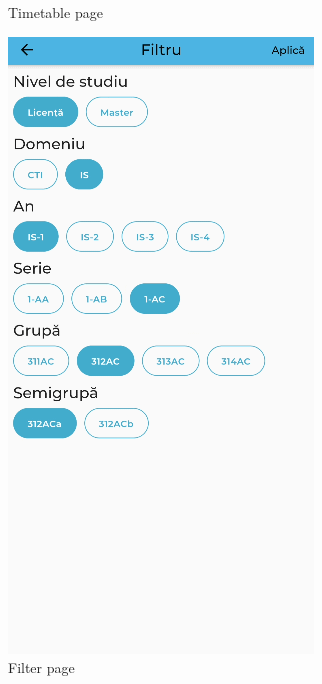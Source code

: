 \begin{figure}[!ht]
\begin{minipage}[b]{0.26\textwidth}
        \caption{Timetable page}
        \label{3:fig:timetable}
    \end{minipage}
    \hfill
    \begin{minipage}[b]{0.26\textwidth}
        \captionsetup{justification=centering}
        \includegraphics[width=\textwidth]{figures/beforedev/image20.png}
        \caption{Filter page}
        \label{3:fig:filter}
    \end{minipage}
\end{figure}

